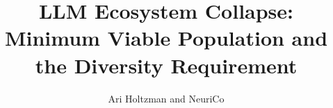 \documentclass{article}
\title{LLM Ecosystem Collapse: Minimum Viable Population and the Diversity Requirement}
\author{Ari Holtzman and NeuriCo}
\begin{document}
\maketitle

\begin{abstract}

\end{abstract}









\end{document}
